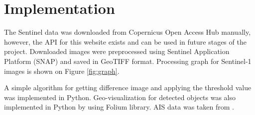 \section{Implementation}

The Sentinel data was downloaded from Copernicus Open Access Hub \cite{copernicus} manually, however, the \gls{API} for this website exists and can be used in future stages of the project. Downloaded images were preprocessed using Sentinel Application Platform (SNAP) \cite{snap} and saved in GeoTIFF format. Processing graph for Sentinel-1 images is shown on Figure \ref{fig:graph}.


A simple algorithm for getting difference image and applying the threshold value was implemented in Python. Geo-visualization for detected objects was also implemented in Python by using Folium \cite{folium} library. \gls{AIS} data was taken from \cite{ais}.
